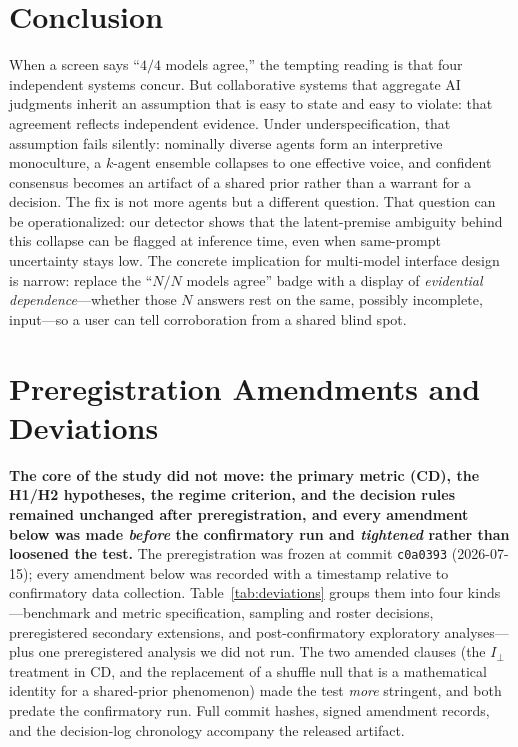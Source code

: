 \documentclass[acmsmall,screen,nonacm]{acmart}
\newcommand{\cd}{\textsf{CD}}
\newcommand{\iperp}{\ensuremath{I_\perp}}
\begin{document}
\section{Conclusion}
\label{sec:conclusion}
When a screen says ``$4/4$ models agree,'' the tempting reading is that four independent systems concur. But
collaborative systems that aggregate AI judgments inherit an assumption that is easy to state and easy
to violate: that agreement reflects independent evidence. Under underspecification, that assumption fails
silently: nominally diverse agents form an interpretive monoculture, a $k$-agent ensemble collapses to one
effective voice, and confident consensus becomes an artifact of a shared prior rather than a warrant for a
decision. The fix is not more agents but a different question. That question can be operationalized: our
detector shows that the latent-premise ambiguity behind this collapse can be flagged at inference time, even
when same-prompt uncertainty stays low. The concrete implication for multi-model interface design is narrow:
replace the ``$N/N$ models agree'' badge with a display of \emph{evidential dependence}---whether those $N$
answers rest on the same, possibly incomplete, input---so a user can tell corroboration from a shared blind
spot.




\appendix
\section{Preregistration Amendments and Deviations}
\label{app:deviations}

\textbf{The core of the study did not move: the primary metric (\cd), the H1/H2 hypotheses, the regime
criterion, and the decision rules remained unchanged after preregistration, and every amendment below was
made \emph{before} the confirmatory run and \emph{tightened} rather than loosened the test.}
The preregistration was frozen at commit \texttt{c0a0393} (2026-07-15); every amendment below
was recorded with a timestamp relative to confirmatory data collection.
Table~\ref{tab:deviations} groups them into four kinds---benchmark and metric specification,
sampling and roster decisions, preregistered secondary extensions, and post-confirmatory
exploratory analyses---plus one preregistered analysis we did not run. The
two amended clauses (the \iperp{} treatment in \cd, and the replacement of a shuffle null that
is a mathematical identity for a shared-prior phenomenon) made the test \emph{more} stringent,
and both predate the confirmatory run. Full commit hashes, signed amendment records, and the
decision-log chronology accompany the released artifact.
\end{document}
